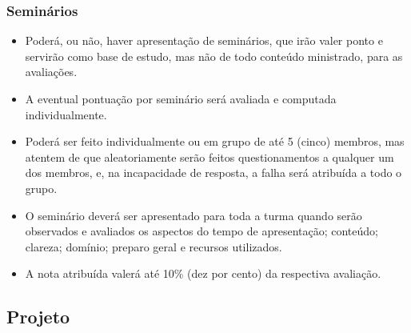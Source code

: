 \begin{frame}[t]\frametitle{Seminários}
  
  \begin{itemize}
    \justifying{}
    \setlength\itemsep{1em}
    \item Poderá, ou não, haver apresentação de seminários, que irão valer ponto e servirão como base de estudo, mas não de todo conteúdo ministrado, para as avaliações.
    \item A eventual pontuação por seminário será avaliada e computada individualmente.
    \item Poderá ser feito individualmente ou em grupo de até 5 (cinco) membros, mas atentem de que aleatoriamente serão feitos questionamentos a qualquer um dos membros, e, na incapacidade de resposta, a falha será atribuída a todo o grupo.
    \item O seminário deverá ser apresentado para toda a turma quando serão observados e avaliados os aspectos do tempo de apresentação; conteúdo; clareza; domínio; preparo geral e recursos utilizados.
    \item A nota atribuída valerá até 10\% (dez por cento) da respectiva avaliação.
  \end{itemize}
  
\end{frame}



\subsection[Projeto]{Projeto}\label{subsec:planejamento-projeto}



